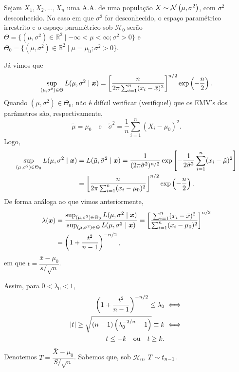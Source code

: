\begin{theorem}[$\mathcal{H}_0:\mu=\mu_0$ \emph{vs.} $\mathcal{H}_1:\mu\neq\mu_0$ -- $\sigma^2$ desconhecido]
Sejam $X_1,X_2,\ldots,X_n$ uma A.A. de uma população $X\sim\normdist{\mu,\sigma^2}$, com $\sigma^2$ desconhecido. No caso em que $\sigma^2$ for desconhecido, o espaço paramétrico irrestrito e o espaço paramétrico sob $\mathcal{H}_0$ serão $\Theta=\{(\mu,\sigma^2)\in\mathbb{R}^2\mid-\infty<\mu<\infty;\sigma^2>0\}$ e $\Theta_0=\{(\mu,\sigma^2)\in\mathbb{R}^2\mid\mu=\mu_0;\sigma^2>0\}$.

Já vimos que
\begin{equation}
\sup_{(\mu,\sigma^2)\in\Theta}L(\mu,\sigma^2\mid\bm{x}) = \left[\frac{n}{2\pi\sum_{i=1}^n(x_i-\,\overline{\!{x}})^2}\right]^{n/2}\exp\left(-\frac{n}{2}\right).
\end{equation}
Quando $(\mu,\sigma^2)\in\Theta_0$, não é difícil verificar (verifique!) que os EMV's dos parâmetros são, respectivamente,
\begin{equation}
\tilde{\mu}=\mu_0 \quad \text{e} \quad \tilde{\sigma}^2=\frac{1}{n}\sum_{i=1}^n(X_i-\mu_0)^2.
\end{equation}
Logo,
\begin{align}
\sup_{(\mu,\sigma^2)\in\Theta_0}L(\mu,\sigma^2\mid\bm{x}) &= L(\tilde{\mu},\tilde{\sigma}^2\mid\bm{x}) = \frac{1}{(2\pi\tilde{\sigma}^2)^{n/2}}\exp\left[-\frac{1}{2\tilde{\sigma}^2}\sum_{i=1}^n(x_i-\tilde{\mu})^2\right]\notag\\
&= \left[\frac{n}{2\pi\sum_{i=1}^n(x_i-\mu_0)^2}\right]^{n/2}\exp\left(-\frac{n}{2}\right).
\end{align}
De forma análoga ao que vimos anteriormente,
\begin{align}
\lambda(\bm{x}) &= \frac{\sup_{(\mu,\sigma^2)\in\Theta_0}L(\mu,\sigma^2\mid\bm{x})}{\sup_{(\mu,\sigma^2)\in\Theta}L(\mu,\sigma^2\mid\bm{x})} = \left[\frac{\sum_{i=1}^n(x_i-\,\overline{\!{x}})^2}{\sum_{i=1}^n(x_i-\mu_0)^2}\right]^{n/2}\notag\\
&= \left(1+\frac{t^2}{n-1}\right)^{-n/2},
\end{align}
em que $t=\dfrac{\bar{x}-\mu_0}{s/\sqrt{n}}$.

Assim, para $0<\lambda_0<1$,
\begin{align}
\left(1+\frac{t^2}{n-1}\right)^{-n/2}\leq\lambda_0 &\iff\notag\\
|t|\geq\sqrt{(n-1)\left(\lambda_0^{-2/n}-1\right)}\equiv k &\iff\notag\\
t\leq-k \quad \text{ou} \quad t\geq k.
\end{align}
Denotemos $T=\dfrac{\bar{X}-\mu_0}{S/\sqrt{n}}$. Sabemos que, sob $\mathcal{H}_0$, $T\sim t_{n-1}$.


\end{theorem}

